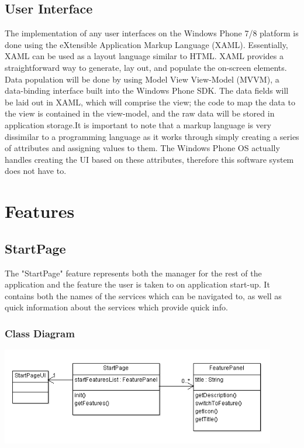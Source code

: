 \documentclass[pdftex,12pt,letter]{article}
\begin{document}
\subsection{User Interface}
The implementation of any user interfaces on the Windows Phone 7/8 platform is done using the eXtensible Application Markup Language (XAML). Essentially, XAML can be used as a layout language similar to HTML. XAML provides a straightforward way to generate, lay out, and populate the on-screen elements. Data population will be done by using Model View View-Model (MVVM), a data-binding interface built into the Windows Phone SDK. The data fields will be laid out in XAML, which will comprise the view; the code to map the data to the view is contained in the view-model, and the raw data will be stored in application storage.It is important to note that a markup language is very dissimilar to a programming language as it works through simply creating a series of attributes and assigning values to them. The Windows Phone OS actually handles creating the UI based on these attributes, therefore this software system does not have to. 
\\
\section{Features}
\subsection{StartPage}
The "StartPage" feature represents both the manager for the rest of the application and the feature the user is taken to on application start-up. It contains both the names of the services which can be navigated to, as well as quick information about the services which provide quick info.
\subsubsection{Class Diagram}
\includegraphics[width=120mm]{StartPageCD.png}
\end{document}
